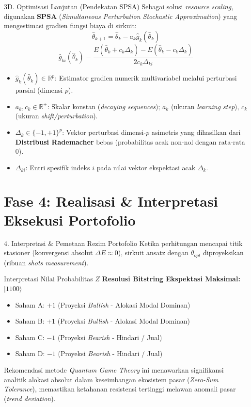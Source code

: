 \documentclass[aspectratio=169,xcolor=pdftex,dvipsnames,table]{beamer}
\begin{document}
\begin{frame}{3D. Optimisasi Lanjutan (Pendekatan SPSA)}
    Sebagai solusi \textit{resource scaling}, digunakan \textbf{SPSA} (\textit{Simultaneous Perturbation Stochastic Approximation}) yang mengestimasi gradien fungsi biaya di sirkuit:
    $$ \hat{\theta}_{k+1} = \hat{\theta}_k - a_k \hat{g}_k(\hat{\theta}_k) $$
    $$ \hat{g}_{ki}(\hat{\theta}_k) = \frac{E(\hat{\theta}_k + c_k \Delta_k) - E(\hat{\theta}_k - c_k \Delta_k)}{2 c_k \Delta_{ki}} $$
    \begin{itemize}
        \item $\hat{g}_k(\hat{\theta}_k) \in \mathbb{R}^p$: Estimator gradien numerik multivariabel melalui perturbasi parsial (dimensi $p$).
        \item $a_k, c_k \in \mathbb{R}^+$: Skalar konstan (\textit{decaying sequences}); $a_k$ (ukuran \textit{learning step}), $c_k$ (ukuran \textit{shift/perturbation}).
        \item $\Delta_k \in \{-1, +1\}^p$: Vektor perturbasi dimensi-$p$ asimetris yang dihasilkan dari \textbf{Distribusi Rademacher} bebas (probabilitas acak non-nol dengan rata-rata 0).
        \item $\Delta_{ki}$: Entri spesifik indeks $i$ pada nilai vektor ekspektasi acak $\Delta_k$.
    \end{itemize}
\end{frame}

\section{Fase 4: Realisasi \& Interpretasi Eksekusi Portofolio}
\begin{frame}{4. Interpretasi \& Pemetaan Rezim Portofolio}
  Ketika perhitungan mencapai titik stasioner (konvergensi absolut $\Delta E \approx 0$), sirkuit ansatz dengan $\theta_{opt}$ diproyeksikan (ribuan \textit{shots measurement}).
  \vspace{0.2cm}
  
  \begin{block}{Interpretasi Nilai Probabilitas $Z$}  
  \textbf{Resolusi Bitstring Ekspektasi Maksimal: $|1100\rangle$}
  \begin{itemize}
      \item Saham A: $+1$ (Proyeksi \textit{Bullish} - Alokasi Modal Dominan)
      \item Saham B: $+1$ (Proyeksi \textit{Bullish} - Alokasi Modal Dominan)
      \item Saham C: $-1$ (Proyeksi \textit{Bearish} - Hindari / Jual)
      \item Saham D: $-1$ (Proyeksi \textit{Bearish} - Hindari / Jual)
  \end{itemize}
  \end{block}
  Rekomendasi metode \textit{Quantum Game Theory} ini menawarkan signifikansi analitik alokasi absolut dalam keseimbangan ekosistem pasar (\textit{Zero-Sum Tolerance}), memastikan ketahanan resistensi tertinggi melawan anomali pasar (\textit{trend deviation}).
\end{frame}
\end{document}
